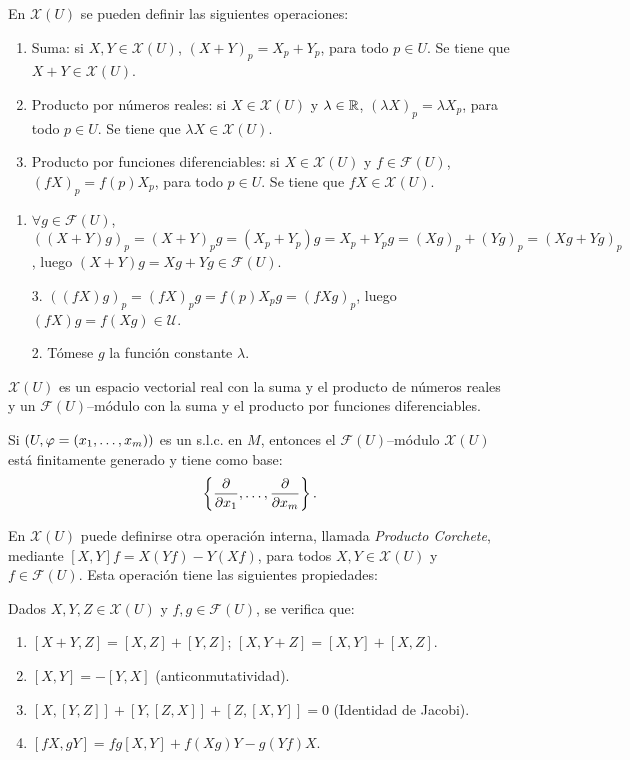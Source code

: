 \documentclass[Cursovd_portada.tex]{subfiles}
\begin{document}
\begin{prop}
En $\mathcal{X}(U)$ se pueden definir las siguientes operaciones:
\begin{enumerate}
\item Suma: si $X,Y\in\mathcal{X}(U)$, $(X+Y)_p=X_p+Y_p$, para todo $p\in U$. Se tiene que $X+Y\in\mathcal{X}(U)$.
\item Producto por números reales: si $X\in\mathcal{X}(U)$ y $\lambda\in\mathbb{R}$, $(\lambda X)_p=\lambda X_p$, para todo
$p\in U$. Se tiene que $\lambda X\in\mathcal{X}(U)$.
\item Producto por funciones diferenciables: si $X\in\mathcal{X}(U)$ y $f\in\mathcal{F}(U)$, $(fX)_p=f(p)X_p$, para todo
$p\in U$. Se tiene que $fX\in\mathcal{X}(U)$.
\end{enumerate}
\end{prop}
\begin{dem}\mbox{}
\begin{enumerate}
\item $\forall g \in \mathcal{F}(U)$, $((X+Y)g)_p = (X+Y)_pg = (X_p+Y_p)g = X_p+Y_pg = (Xg)_p+(Yg)_p = (Xg+Yg)_p$, luego $(X+Y)g = Xg+Yg \in \mathcal{F}(U)$.
\item[3.] $((fX)g)_p = (fX)_pg = f(p)X_pg = (fXg)_p$, luego $(fX)g = f(Xg) \in \mathcal{U}$.
\item[2.] Tómese $g$ la función constante $λ$.
\end{enumerate}
\end{dem}
\begin{prop} $\mathcal{X}(U)$ es un espacio vectorial real con la suma y el producto de números reales y un
$\mathcal{F}(U)$--módulo con la suma y el producto por funciones diferenciables.
\end{prop}
\begin{prop}
Si $(U,\varphi=(x_1,\dots ,x_m))$ es un s.l.c. en $M$, entonces el $\mathcal{F}(U)$--módulo $\mathcal{X}(U)$ está
finitamente generado y tiene como base:
$$\left\{\displaystyle{\frac{\partial}{\partial x_1}},\dots ,\displaystyle{\frac{\partial}{\partial x_m}}\right\}.$$
\end{prop}
En $\mathcal{X}(U)$ puede definirse otra operación interna, llamada {\it Producto Corchete}, mediante
$[X,Y]f=X(Yf)-Y(Xf)$, para todos $X,Y\in\mathcal{X}(U)$ y $f\in\mathcal{F}(U)$. Esta operación tiene las
siguientes propiedades:
\begin{prop}
Dados $X,Y,Z\in\mathcal{X}(U)$ y $f,g\in\mathcal{F}(U)$, se verifica que:
\begin{enumerate}
\item $[X+Y,Z]=[X,Z]+[Y,Z]$; $[X,Y+Z]=[X,Y]+[X,Z]$.
\item $[X,Y]=-[Y,X]$ (anticonmutatividad).
\item $[X,[Y,Z]]+[Y,[Z,X]]+[Z,[X,Y]]=0$ (Identidad de Jacobi).
\item $[fX,gY]=fg[X,Y]+f(Xg)Y-g(Yf)X$.
\end{enumerate}
\end{prop}
\end{document}
